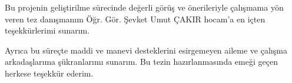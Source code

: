Bu projenin geliştirilme sürecinde değerli görüş ve önerileriyle çalışmama yön veren tez danışmanım Öğr. Gör. Şevket Umut ÇAKIR hocam'a en içten teşekkürlerimi sunarım. 

Ayrıca bu süreçte maddi ve manevi desteklerini esirgemeyen aileme ve çalışma arkadaşlarıma şükranlarımı sunarım. Bu tezin hazırlanmasında emeği geçen herkese teşekkür ederim.

\vspace{30pt}

\noindent
